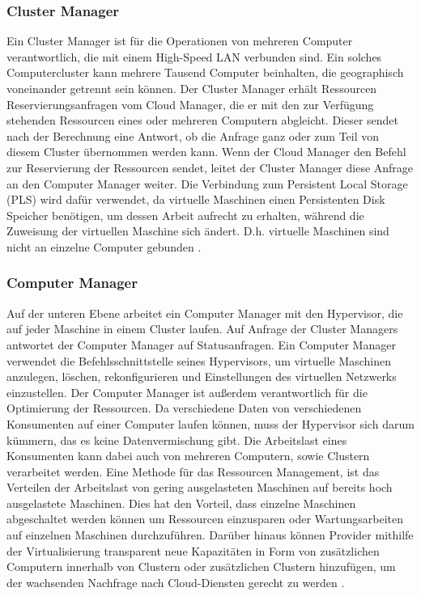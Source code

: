\subsubsection{Cluster Manager}
Ein Cluster Manager ist für die Operationen von mehreren Computer verantwortlich, die mit einem High-Speed LAN verbunden sind. Ein solches Computercluster kann mehrere Tausend Computer beinhalten, die geographisch voneinander getrennt sein können.
Der Cluster Manager erhält Ressourcen Reservierungsanfragen vom Cloud Manager, die er mit den zur Verfügung stehenden Ressourcen eines oder mehreren Computern abgleicht. Dieser sendet nach der 
Berechnung eine Antwort, ob die Anfrage ganz oder zum Teil von diesem Cluster übernommen werden kann. Wenn der Cloud Manager den Befehl zur Reservierung der Ressourcen sendet, leitet der Cluster Manager diese Anfrage an den Computer Manager weiter. 
Die Verbindung zum Persistent Local Storage (PLS) wird dafür verwendet, da virtuelle Maschinen einen Persistenten Disk Speicher benötigen, um dessen Arbeit aufrecht zu erhalten, während die Zuweisung der virtuellen Maschine sich ändert.
D.h. virtuelle Maschinen sind nicht an einzelne Computer gebunden \cite{Badger}.

\subsubsection{Computer Manager}
Auf der unteren Ebene arbeitet ein Computer Manager mit den Hypervisor, die auf jeder Maschine in einem Cluster laufen.
Auf Anfrage der Cluster Managers antwortet der Computer Manager auf Statusanfragen. Ein Computer Manager verwendet die Befehlsschnittstelle seines Hypervisors, um virtuelle Maschinen anzulegen, löschen, rekonfigurieren und Einstellungen des virtuellen Netzwerks einzustellen.
Der Computer Manager ist außerdem verantwortlich für die Optimierung der Ressourcen. Da verschiedene Daten von verschiedenen Konsumenten auf einer Computer laufen können, muss der Hypervisor sich darum kümmern, das es keine Datenvermischung gibt.
Die Arbeitslast eines Konsumenten kann dabei auch von mehreren Computern, sowie Clustern verarbeitet werden. 
Eine Methode für das Ressourcen Management, ist das Verteilen der Arbeitslast von gering ausgelasteten Maschinen auf bereits hoch ausgelastete Maschinen. Dies hat den Vorteil, dass einzelne Maschinen abgeschaltet werden können um Ressourcen einzusparen oder Wartungsarbeiten auf einzelnen Maschinen durchzuführen.
Darüber hinaus können Provider mithilfe der Virtualisierung transparent neue Kapazitäten in Form von zusätzlichen Computern innerhalb von Clustern oder zusätzlichen Clustern hinzufügen, um der wachsenden Nachfrage nach Cloud-Diensten gerecht zu werden \cite{Badger}.
